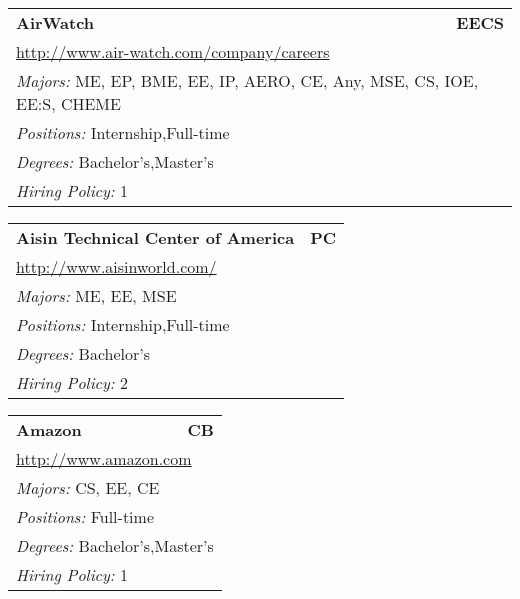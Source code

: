\documentclass[twoside]{article}
\begin{document}
\begin{center}
\begin{multicols}{3}
\begin{FlushLeft}
\begin{minipage}{\columnwidth}
\end{minipage}
 
\begin{minipage}{\columnwidth}\begin{tabularx}{.95\columnwidth}{Xr}
                 {\Large\bf AirWatch} & {\Large\bf EECS}\\
    \multicolumn{2}{p{.95\columnwidth}}{\url{http://www.air-watch.com/company/careers}}\\
    \multicolumn{2}{p{.95\columnwidth}}{\emph{Majors:} ME, EP, BME, EE, IP, AERO, CE, Any, MSE, CS, IOE, EE:S, CHEME}\\
    \multicolumn{2}{p{.95\columnwidth}}{\emph{Positions:} Internship,Full-time}\\
    \multicolumn{2}{p{.95\columnwidth}}{\emph{Degrees:} Bachelor's,Master's}\\
    \multicolumn{2}{p{.95\columnwidth}}{\emph{Hiring Policy:} 1}\\
    \end{tabularx}
    
\end{minipage}
 
\begin{minipage}{\columnwidth}\begin{tabularx}{.95\columnwidth}{Xr}
                 {\Large\bf Aisin Technical Center of America} & {\Large\bf PC}\\
    \multicolumn{2}{p{.95\columnwidth}}{\url{http://www.aisinworld.com/}}\\
    \multicolumn{2}{p{.95\columnwidth}}{\emph{Majors:} ME, EE, MSE}\\
    \multicolumn{2}{p{.95\columnwidth}}{\emph{Positions:} Internship,Full-time}\\
    \multicolumn{2}{p{.95\columnwidth}}{\emph{Degrees:} Bachelor's}\\
    \multicolumn{2}{p{.95\columnwidth}}{\emph{Hiring Policy:} 2}\\
    \end{tabularx}
    
\end{minipage}
 
\begin{minipage}{\columnwidth}\begin{tabularx}{.95\columnwidth}{Xr}
                 {\Large\bf Amazon} & {\Large\bf CB}\\
    \multicolumn{2}{p{.95\columnwidth}}{\url{http://www.amazon.com}}\\
    \multicolumn{2}{p{.95\columnwidth}}{\emph{Majors:} CS, EE, CE}\\
    \multicolumn{2}{p{.95\columnwidth}}{\emph{Positions:} Full-time}\\
    \multicolumn{2}{p{.95\columnwidth}}{\emph{Degrees:} Bachelor's,Master's}\\
    \multicolumn{2}{p{.95\columnwidth}}{\emph{Hiring Policy:} 1}\\
    \end{tabularx}
    

\end{minipage}
\end{FlushLeft}
\end{multicols}
\end{center}
\end{document}
